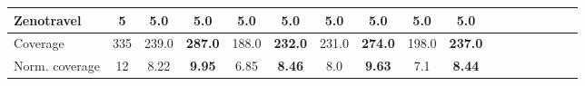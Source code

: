 \documentclass[letterpaper]{article} %
\begin{document}
\begin{table*}[h]
{\begin{tabular}{lccccccccccccccccl}
	Zenotravel & 5 & \textbf{5.0} & \textbf{5.0} & \textbf{5.0} & \textbf{5.0} & \textbf{5.0} & \textbf{5.0} & \textbf{5.0} &\multicolumn{2}{c}{ \textbf{5.0}  } \\ 
	\midrule 
	Coverage & 335 & 239.0 & \textbf{287.0} & 188.0 & \textbf{232.0} & 231.0 & \textbf{274.0} & 198.0 &\multicolumn{2}{c}{ \textbf{237.0}  } \\ 
	Norm. coverage & 12 & 8.22 & \textbf{9.95} & 6.85 & \textbf{8.46} & 8.0 & \textbf{9.63} & 7.1 &\multicolumn{2}{c}{ \textbf{8.44}  } \\ 
	\bottomrule 
	\end{tabular}
	}
\end{table*}

\end{document}
